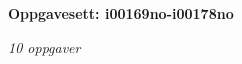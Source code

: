 \centerline{\bf Oppgavesett: i00169no-i00178no}
\vskip 10pt
\centerline{\it 10 oppgaver}\vskip 10pt
\vskip 10pt
